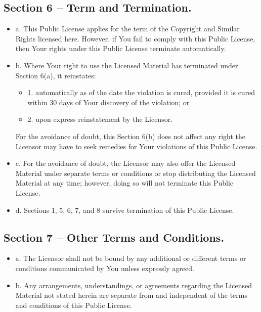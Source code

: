 \subsection*{Section 6 – Term and Termination.}
	\begin{itemize}
		\item a. This Public License applies for the term of the Copyright and Similar Rights licensed here. However, if You fail to comply with this Public License, then Your rights under this Public License terminate automatically.
		\item b. Where Your right to use the Licensed Material has terminated under Section 6(a), it reinstates:
			\begin{itemize}
				\item 1. automatically as of the date the violation is cured, provided it is cured within 30 days of Your discovery of the violation; or
				\item 2. upon express reinstatement by the Licensor.
			\end{itemize}
			For the avoidance of doubt, this Section 6(b) does not affect any right the Licensor may have to seek remedies for Your violations of this Public License.
		\item c. For the avoidance of doubt, the Licensor may also offer the Licensed Material under separate terms or conditions or stop distributing the Licensed Material at any time; however, doing so will not terminate this Public License.
		\item d. Sections 1, 5, 6, 7, and 8 survive termination of this Public License.
	\end{itemize}

\subsection*{Section 7 – Other Terms and Conditions.}
	\begin{itemize}
		\item a. The Licensor shall not be bound by any additional or different terms or conditions communicated by You unless expressly agreed.
		\item b. Any arrangements, understandings, or agreements regarding the Licensed Material not stated herein are separate from and independent of the terms and conditions of this Public License.
	\end{itemize}

